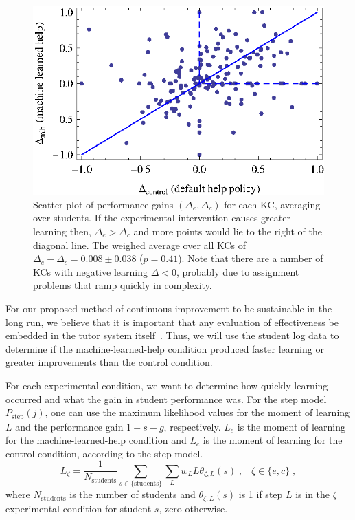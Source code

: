 \documentclass{edm_template}
\begin{document}
\begin{figure}
   \centering\includegraphics{scatter-gain}
   \caption{Scatter plot of performance gains $\left(\Delta_e,\Delta_c\right)$
   for each KC, averaging over students.  If the experimental intervention
   causes greater learning then, $\Delta_e > \Delta_c$ and more points
   would lie to the right of the diagonal line.
   The weighed average over all KCs of $\Delta_e - \Delta_c = 
        0.008\pm 0.038$ ($p=0.41$).
   Note that there are a number
   of KCs with negative learning $\Delta<0$, probably due to 
   assignment problems that ramp quickly in complexity. 
   }\label{scattergain}
\end{figure}

For our proposed method of continuous improvement to be sustainable in
the long run, we believe that it is important that any evaluation of
effectiveness be embedded in the tutor system
itself~\cite{vanlehn_intelligent_2008}.  Thus, we will use the student
log data to determine if the machine-learned-help condition produced faster
learning or greater improvements than the control condition.


For each experimental condition, we want to determine how quickly
learning occurred and what the gain in student performance was.
For the step model $P_\mathrm{step}(j)$, one can use the maximum
likelihood values for the moment of learning $L$ and the
performance gain $1-s-g$, respectively.  
$L_e$ is the moment of learning for the machine-learned-help condition
and $L_c$ is the moment of learning for the control condition,
according to the step model.
%
\begin{equation}
    L_\zeta = \frac{1}{N_\mathrm{students}}
              \sum_{s \in \{\mathrm{students}\}}
    \sum_L w_L L \theta_{\zeta,L}(s) \;, \;\;\; \zeta \in \{e,c\} \; ,
\end{equation}
%
where $N_\mathrm{students}$ is the number of students and 
$\theta_{\zeta,L}(s)$ is 1 if step $L$ is in the $\zeta$ experimental
condition for student $s$, zero otherwise.
\end{document}
